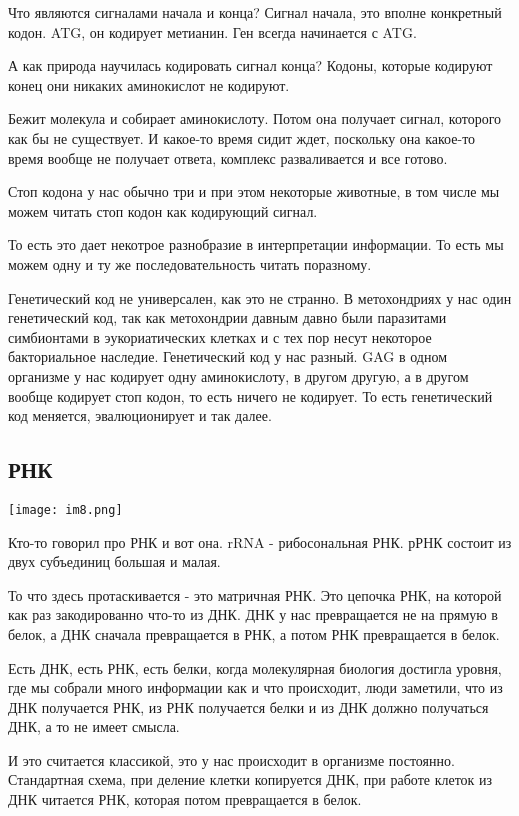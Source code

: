 Что являются сигналами начала и конца? 
Сигнал начала, это вполне конкретный кодон. ATG, он 
кодирует метианин. Ген всегда начинается с 
ATG. 

А как природа научилась кодировать сигнал конца? Кодоны, 
которые кодируют конец они никаких 
аминокислот не кодируют. 

Бежит молекула и собирает аминокислоту. Потом она получает 
сигнал, которого как бы не существует. И какое-то время сидит ждет, 
поскольку она какое-то время вообще не получает ответа, 
комплекс разваливается и все готово. 

Стоп кодона у нас обычно три и при этом некоторые животные, 
в том числе мы можем читать стоп кодон как кодирующий сигнал. 

То есть это дает некотрое разнобразие в интерпретации информации. 
То есть мы можем одну и ту же последовательность читать поразному. 

Генетический код не универсален, как это не странно. В метохондриях
у нас один генетический код, так как метохондрии давным давно были 
паразитами симбионтами в эукориатических клетках и с тех 
пор несут некоторое бакториальное наследие. Генетический код 
у нас разный. GAG в одном организме у нас кодирует 
одну аминокислоту, в другом другую, а в другом вообще кодирует 
стоп кодон, то есть ничего не кодирует. То есть 
генетический код меняется, эвалюционирует и 
так далее.


\subsection{РНК}
\texttt{[image: im8.png]}

Кто-то говорил про РНК и вот она. rRNA - рибосональная 
РНК. рРНК состоит из двух субъединиц большая и малая. 

То что здесь протаскивается - это матричная РНК. Это 
цепочка РНК, на которой как раз закодированно что-то из 
ДНК. ДНК у нас превращается не на прямую в белок, 
а ДНК сначала превращается в РНК, 
а потом РНК превращается в белок. 

Есть ДНК, есть РНК, есть белки, когда молекулярная 
биология достигла уровня, где мы собрали много информации 
как и что происходит, люди заметили, что из 
ДНК получается РНК, из РНК получается белки и из 
ДНК должно получаться ДНК, а то не имеет смысла. 

И это считается классикой, это у нас 
происходит в организме постоянно. Стандартная схема, 
при деление клетки копируется ДНК, при работе клеток 
из ДНК читается РНК, которая потом превращается в белок. 

